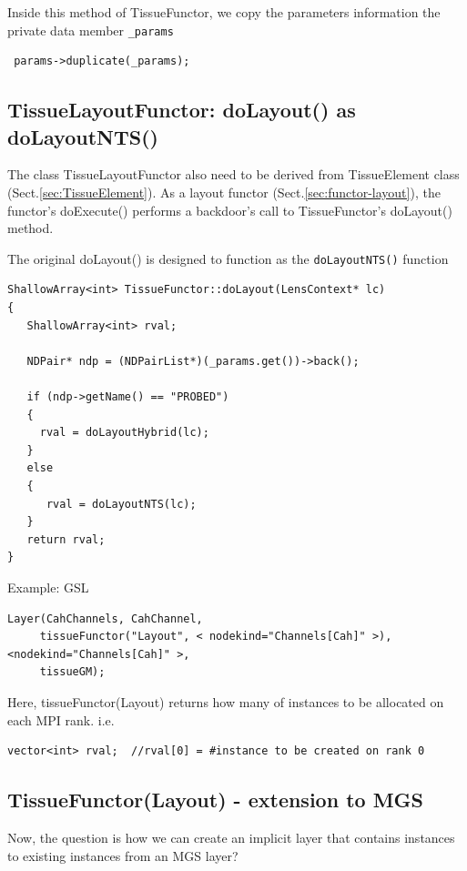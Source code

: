 Inside this method of TissueFunctor, we copy the parameters information the
private data member \verb!_params!
\begin{verbatim}
 params->duplicate(_params);
\end{verbatim}

\subsection{TissueLayoutFunctor: doLayout() as doLayoutNTS()}
\label{sec:TissueFunctor-layout}
\label{sec:TissueLayoutFunctor}


The class TissueLayoutFunctor also need to be derived from TissueElement class
(Sect.\ref{sec:TissueElement}). As a layout functor
(Sect.\ref{sec:functor-layout}), the functor's doExecute() performs a backdoor's
call to TissueFunctor's doLayout() method.

The original doLayout() is designed to function as the \verb!doLayoutNTS()!
function

\begin{verbatim}
ShallowArray<int> TissueFunctor::doLayout(LensContext* lc)
{
   ShallowArray<int> rval; 
   
   NDPair* ndp = (NDPairList*)(_params.get())->back();
   
   if (ndp->getName() == "PROBED")
   {
     rval = doLayoutHybrid(lc);
   }
   else
   {
      rval = doLayoutNTS(lc);
   }
   return rval;
}
\end{verbatim}


Example: GSL
{\tiny
\begin{verbatim}
Layer(CahChannels, CahChannel, 
     tissueFunctor("Layout", < nodekind="Channels[Cah]" >), <nodekind="Channels[Cah]" >, 
     tissueGM);
\end{verbatim}
}

Here, tissueFunctor(Layout) returns how many of instances to be allocated on
each MPI rank. i.e.
\begin{verbatim}
vector<int> rval;  //rval[0] = #instance to be created on rank 0
\end{verbatim}


\subsection{TissueFunctor(Layout) - extension to MGS}
\label{sec:TissueLayoutFunctor-extension-MGS}

Now, the question is how we can create an implicit layer that contains
instances to existing instances from an MGS layer? 

